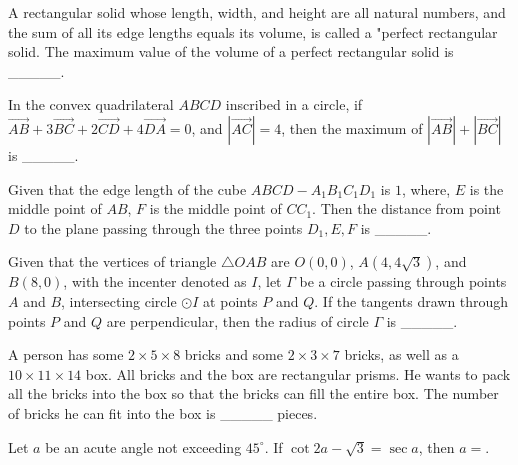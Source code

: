 \begin{problem}\label{AIChallenge_Geo4}
A rectangular solid whose length, width, and height are all natural numbers, and the sum of all its edge lengths equals its volume, is called a "perfect rectangular solid. The maximum value of the volume of a perfect rectangular solid is \_\_\_\_\_.
\end{problem}


\begin{problem}\label{AIChallenge_Geo7}
In the convex quadrilateral $A B C D$ inscribed in a circle, if $\overrightarrow{A B}+3 \overrightarrow{B C}+2 \overrightarrow{C D}+4 \overrightarrow{D A}=0$, and $|\overrightarrow{A C}|=4$, then the maximum of  $|\overrightarrow{A B}|+|\overrightarrow{B C}|$ is \_\_\_\_\_.
\end{problem}


\begin{problem}\label{AIChallenge_Geo8}
Given that the edge length of the cube $A B C D-A_{1} B_{1} C_{1} D_{1}$ is $1$, where, $E$ is the middle point of $A B$, $F$ is the middle point of $C C_{1}$. Then the distance from point $D$ to the plane passing through the three points $D_{1}, E, F$ is \_\_\_\_\_.
\end{problem}



\begin{problem}\label{AIChallenge_Geo9}
Given that the vertices of triangle $\triangle OAB$ are $O(0,0)$, $A(4,4\sqrt{3})$, and $B(8,0)$, with the incenter denoted as $I$, let $\Gamma$ be a circle passing through points $A$ and $B$, intersecting circle $\odot I$ at points $P$ and $Q$. If the tangents drawn through points $P$ and $Q$ are perpendicular, then the radius of circle $\Gamma$ is \_\_\_\_\_.

\end{problem}


\begin{problem}\label{AIChallenge_Geo10}
A person has some $2 \times 5 \times 8$ bricks and some $2 \times 3 \times 7$ bricks, as well as a $10 \times 11 \times 14$ box. All bricks and the box are rectangular prisms. He wants to pack all the bricks into the box so that the bricks can fill the entire box. The number of bricks he can fit into the box is \_\_\_\_\_ pieces.
\end{problem}


\begin{problem}\label{AIChallenge_Geo11}
Let $a$ be an acute angle not exceeding $45^\circ$. If $\cot 2a - \sqrt{3} = \sec a$, then $a =$.
\end{problem}

